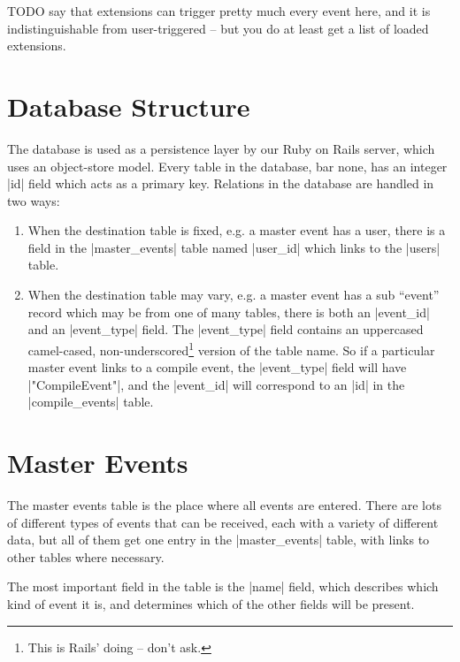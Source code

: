 \documentclass{book}
\begin{document}
TODO say that extensions can trigger pretty much every event here, and it is
indistinguishable from user-triggered -- but you do at least get a list of
loaded extensions.

\chapter{Database Structure}
\label{sec:assoc}

The database is used as a persistence layer by our Ruby on Rails server, which
uses an object-store model.  Every table in the database, bar none, has an
integer |id| field which acts as a primary key.  Relations in the database are
handled in two ways:

\begin{enumerate}
\item When the destination table is fixed, e.g. a master event has a user,
  there is a field in the |master_events| table named |user_id| which links to
  the |users| table.
\item When the destination table may vary, e.g. a master event has a sub
  ``event'' record which may be from one of many tables, there is both an
  |event_id| and an |event_type| field.  The |event_type| field contains an
  uppercased camel-cased, non-underscored\footnote{This is Rails' doing -- don't ask.} version
  of the table name.  So if a particular master event links to a compile
  event, the |event_type| field will have |"CompileEvent"|, and the |event_id|
  will correspond to an |id| in the |compile_events| table.
\end{enumerate}

\chapter{Master Events}

The master events table is the place where all events are entered.  There are
lots of different types of events that can be received, each with a variety of
different data, but all of them get one entry in the |master_events|
table, with links to other tables where necessary.

The most important field in the table is the |name| field, which describes
which kind of event it is, and determines which of the other fields will be present.
\end{document}
